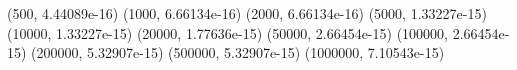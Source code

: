 (500, 4.44089e-16) (1000, 6.66134e-16) (2000, 6.66134e-16) (5000, 1.33227e-15) (10000, 1.33227e-15) (20000, 1.77636e-15) (50000, 2.66454e-15) (100000, 2.66454e-15) (200000, 5.32907e-15) (500000, 5.32907e-15) (1000000, 7.10543e-15) 